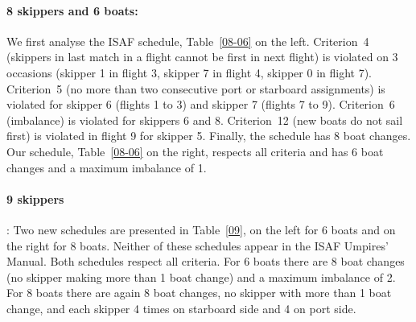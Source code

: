 \documentclass{llncs}
\begin{document}
\paragraph{8 skippers and 6 boats:} We first analyse the ISAF schedule, Table~\ref{08-06} on the
left. Criterion~4 (skippers in last match in a flight cannot be first in next flight) is violated on
3 occasions (skipper 1 in flight 3, skipper 7 in flight 4, skipper 0 in flight 7). Criterion~5 (no
more than two consecutive port or starboard assignments) is violated for skipper 6 (flights 1 to 3)
and skipper 7 (flights 7 to 9). Criterion~6 (imbalance) is violated for skippers 6 and 8. Criterion~12  (new
boats do not sail first) is violated in flight 9 for skipper 5. Finally, the schedule has 8 boat
changes. Our schedule, Table~\ref{08-06} on the right, respects all criteria and has 6 boat changes
and a maximum imbalance of 1.

\paragraph{9 skippers}: Two new schedules are presented in Table~\ref{09}, on the left for 6 boats
and on the right for 8 boats. Neither of these schedules appear in the ISAF Umpires' Manual. Both
schedules respect all criteria. For 6 boats there are 8 boat changes (no skipper making more than 1
boat change) and a maximum imbalance of 2. For 8 boats there are again 8 boat changes, no skipper
with more than 1 boat change, and each skipper 4 times on starboard side and 4 on port side.
\end{document}
